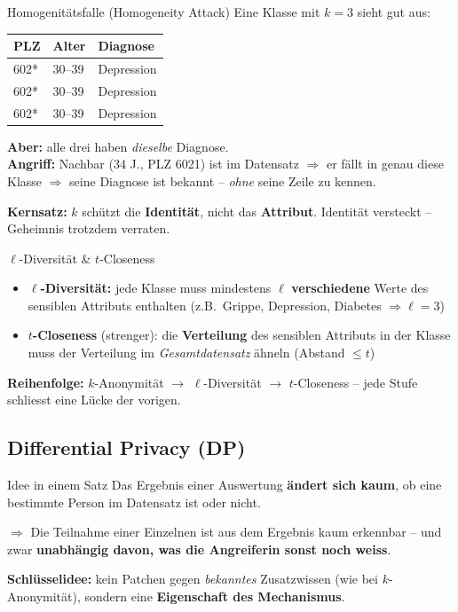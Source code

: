 \documentclass[a4paper, fontsize=7pt]{scrartcl}
\renewcommand*{\arraystretch}{1.5}  %
\begin{document}
\begin{mainbox}{Homogenitätsfalle (Homogeneity Attack)}
Eine Klasse mit $k = 3$ sieht gut aus:
\renewcommand*{\arraystretch}{1.1}
\begin{center}
\setlength{\tabcolsep}{4pt}
\begin{tabular}{@{}l|l|l@{}}
\textbf{PLZ} & \textbf{Alter} & \textbf{Diagnose} \\
\hline
602* & 30--39 & Depression \\
602* & 30--39 & Depression \\
602* & 30--39 & Depression \\
\end{tabular}
\end{center}
\textbf{Aber:} alle drei haben \emph{dieselbe} Diagnose.\\
\textbf{Angriff:} Nachbar (34 J., PLZ 6021) ist im Datensatz $\Rightarrow$
er fällt in genau diese Klasse $\Rightarrow$ seine Diagnose ist bekannt --
\emph{ohne} seine Zeile zu kennen.

\textbf{Kernsatz:} $k$ schützt die \textbf{Identität}, nicht das
\textbf{Attribut}. Identität versteckt -- Geheimnis trotzdem verraten.
\end{mainbox}

\begin{mainbox}{$\ell$-Diversität \& $t$-Closeness}
\begin{itemize}
    \item \textbf{$\ell$-Diversität:} jede Klasse muss mindestens $\ell$
          \textbf{verschiedene} Werte des sensiblen Attributs enthalten
          (z.B.\ Grippe, Depression, Diabetes $\Rightarrow \ell = 3$)
    \item \textbf{$t$-Closeness} (strenger): die \textbf{Verteilung} des
          sensiblen Attributs in der Klasse muss der Verteilung im
          \emph{Gesamtdatensatz} ähneln (Abstand $\le t$)
\end{itemize}
\textbf{Reihenfolge:} $k$-Anonymität $\to$ $\ell$-Diversität $\to$
$t$-Closeness -- jede Stufe schliesst eine Lücke der vorigen.
\end{mainbox}

\subsection{Differential Privacy (DP)}

\begin{mainbox}{Idee in einem Satz}
Das Ergebnis einer Auswertung \textbf{ändert sich kaum}, ob eine bestimmte
Person im Datensatz ist oder nicht.

$\Rightarrow$ Die Teilnahme einer Einzelnen ist aus dem Ergebnis kaum
erkennbar -- und zwar \textbf{unabhängig davon, was die Angreiferin sonst
noch weiss}.

\textbf{Schlüsselidee:} kein Patchen gegen \emph{bekanntes} Zusatzwissen
(wie bei $k$-Anonymität), sondern eine \textbf{Eigenschaft des
Mechanismus}.
\end{mainbox}
\end{document}
